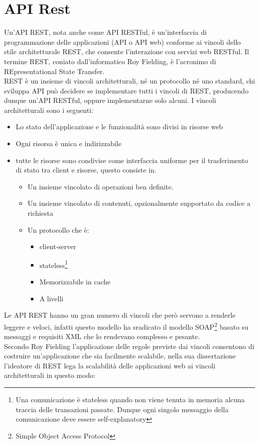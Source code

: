\section{API Rest}
Un'API REST, nota anche come API RESTful, è un'interfaccia di programmazione delle applicazioni (API o API web) conforme ai vincoli dello stile architetturale REST, che consente l'interazione con servizi web RESTful. Il termine REST, coniato dall'informatico Roy Fielding, è l'acronimo di REpresentational State Transfer.\cite{APIRest}
\\
REST è un insieme di vincoli architetturali, né un protocollo né uno standard, chi sviluppa API può decidere se implementare tutti i vincoli di REST, producendo dunque un'API RESTful, oppure implementarne solo alcuni. I vincoli architetturali sono i seguenti:
\begin{itemize}
    \item Lo stato dell'applicazione e le funzionalità sono divisi in risorse web
    \item Ogni risorsa è unica e indirizzabile
    \item tutte le risorse sono condivise come interfaccia uniforme per il trasferimento di stato tra client e risorse, questo consiste in.
        \begin{itemize}
            \item Un insieme vincolato di operazioni ben definite.
            \item Un insieme vincolato di contenuti, opzionalmente supportato da codice a richiesta
            \item Un protocollo che è:
            \begin{itemize}
                \item client-server
                \item stateless\footnote{
                Una comunicazione è stateless quando non viene tenuta in memoria alcuna traccia delle transazioni passate. Dunque ogni singolo messaggio della comunicazione deve essere self-explanatory
                }
                \item Memorizzabile in cache
                \item A livelli
            \end{itemize}
        \end{itemize}
\end{itemize}
Le API REST hanno un gran numero di vincoli che però servono a renderle leggere e veloci, infatti questo modello ha sradicato il modello SOAP\footnote{Simple Object Access Protocol} basato su messaggi e requisiti XML che lo rendevano complesso e pesante.\cite{APIRest}
\\
Secondo Roy Fielding l'applicazione delle regole previste dai vincoli consentono di costruire un'applicazione che sia facilmente scalabile, nella sua dissertazione l'ideatore di REST lega la scalabilità delle applicazioni web ai vincoli architetturali in questo modo\cite{Fielding2000}:

